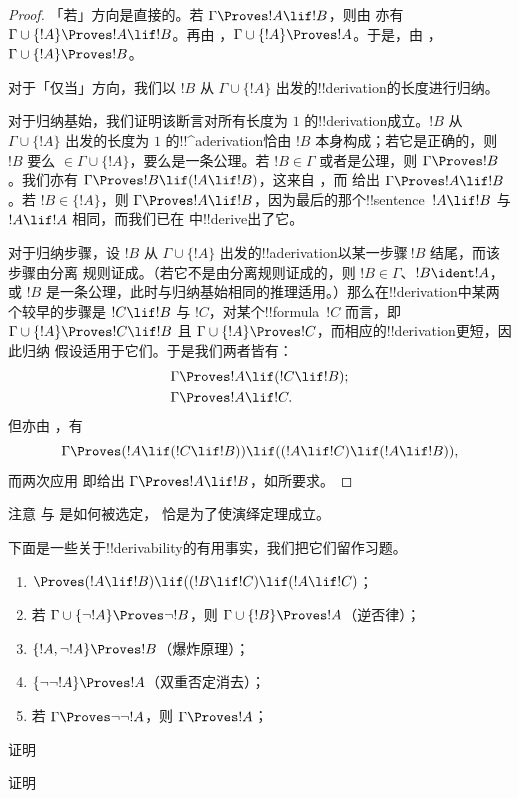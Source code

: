 \documentclass[../../../include/open-logic-section]{subfiles}
\begin{document}
\begin{proof}
「若」方向是直接的。若 $\Gamma \Proves !A \lif !B$，则由
 亦有 $\Gamma \cup \{!A\} \Proves !A \lif !B$。再由
，$\Gamma \cup \{!A\} \Proves !A$。于是，由 ，$\Gamma \cup
\{!A\} \Proves !B$。

对于「仅当」方向，我们以 $!B$ 从 $\Gamma \cup \{!A\}$ 出发的!!{derivation}的长度进行归纳。

对于归纳基始，我们证明该断言对所有长度为 $1$ 的!!{derivation}成立。$!B$ 从 $\Gamma \cup \{!A\}$ 出发的长度为 $1$ 的!!^a{derivation}恰由 $!B$ 本身构成；若它是正确的，则 $!B$ 要么 $\in \Gamma \cup \{!A\}$，要么是一条公理。若 $!B \in \Gamma$ 或者是公理，则 $\Gamma \Proves !B$。我们亦有 $\Gamma
\Proves !B \lif (!A \lif !B)$，这来自 ，而
 给出 $\Gamma \Proves !A \lif !B$。若 $!B \in \{ !A\}$，则 $\Gamma \Proves !A \lif !B$，因为最后的那个!!{sentence}~$!A
\lif !B$ 与 $!A \lif !A$ 相同，而我们已在
 中!!{derive}出了它。

对于归纳步骤，设 $!B$ 从
$\Gamma \cup \{!A\}$ 出发的!!a{derivation}以某一步骤$~!B$ 结尾，而该步骤由分离
规则证成。（若它不是由分离规则证成的，则 $!B \in \Gamma$、$!B
\ident !A$，或 $!B$ 是一条公理，此时与归纳基始相同的推理适用。）那么在!!{derivation}中某两个较早的步骤是 $!C \lif !B$ 与 $!C$，对某个!!{formula}~$!C$
而言，即 $\Gamma \cup \{!A\} \Proves !C \lif !B$ 且 $\Gamma \cup \{!A\}
\Proves !C$，而相应的!!{derivation}更短，因此归纳
假设适用于它们。于是我们两者皆有：
\begin{align*}
  & \Gamma \Proves !A \lif (!C \lif !B); \\
  & \Gamma \Proves !A \lif !C.
\end{align*}
但亦由 ，有
\[
\Gamma \Proves (!A \lif (!C \lif !B)) \lif
((!A\lif !C)  \lif (!A \lif !B)),
\]
而两次应用  即给出
$\Gamma \Proves !A \lif !B$，如所要求。
\end{proof}

注意  与  是如何被选定，
恰是为了使演绎定理成立。

下面是一些关于!!{derivability}的有用事实，我们把它们留作习题。

\begin{prop}
\begin{enumerate}
\item $\Proves (!A \lif !B) \lif ((!B \lif !C)
  \lif (!A \lif !C)$； 
\item 若 $\Gamma \cup \{ \lnot !A\}
  \Proves \lnot !B$，则 $\Gamma \cup \{ !B\} \Proves
  !A$（逆否律）； 
\item  $\{ !A, \lnot!A\} \Proves
    !B$（爆炸原理）； 
\item  $\{ \lnot\lnot!A\} \Proves
  !A$（双重否定消去）；
\item 若 $\Gamma \Proves \lnot\lnot!A$，则 $\Gamma \Proves
  !A$；
\end{enumerate}
\end{prop}

\begin{prob}
  证明 
\end{prob}
\tagendprob

\begin{prob}
  证明 
\end{prob}
\tagendprob
\end{document}
